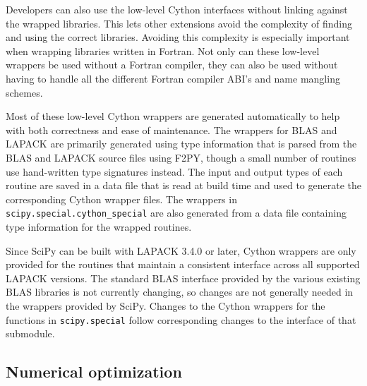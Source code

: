 \documentclass[fleqn,10pt]{wlscirep}
\begin{document}
Developers can also use the low-level Cython interfaces without linking against the wrapped libraries\cite{blas-lapack-wrappers-scipy-2015}.
This lets other extensions avoid the complexity of finding and using the correct libraries.
Avoiding this complexity is especially important when wrapping libraries written in Fortran.
Not only can these low-level wrappers be used without a Fortran compiler, they can also be used without having to handle all the different Fortran compiler ABI's and name mangling schemes.

Most of these low-level Cython wrappers are generated automatically to help with both correctness and ease of maintenance. 
The wrappers for BLAS and LAPACK are primarily generated using type information that is parsed from the BLAS and LAPACK source files using F2PY\cite{peterson2009f2py}, though a small number of routines use hand-written type signatures instead.
The input and output types of each routine are saved in a data file that is read at build time and used to generate the corresponding Cython wrapper files.
The wrappers in \texttt{scipy.{\allowbreak}special.{\allowbreak}cython\_special} are also generated from a data file containing type information for the wrapped routines.

Since SciPy can be built with LAPACK 3.4.0 or later, Cython wrappers are only provided for the routines that maintain a consistent interface across all supported LAPACK versions.
The standard BLAS interface provided by the various existing BLAS libraries is not currently changing, so changes are not generally needed in the wrappers provided by SciPy.
Changes to the Cython wrappers for the functions in \texttt{scipy.{\allowbreak}special} follow corresponding changes to the interface of that submodule.

\subsection*{Numerical optimization}

\end{document}
